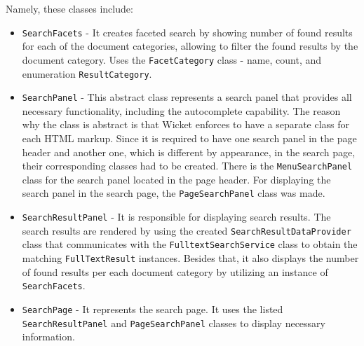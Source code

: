 Namely, these classes include:

\begin{itemize}
	
	\item \texttt{SearchFacets} - It creates faceted search by showing number of found results for each of the document categories, allowing to filter the found results by the document category. Uses the \texttt{FacetCategory} class - name, count, and enumeration \texttt{ResultCategory}. %
	
	\item \texttt{SearchPanel} - This abstract class represents a search panel that provides all necessary functionality, including the autocomplete capability. 
The reason why the class is abstract is that Wicket enforces to have a separate class for each HTML markup. 
Since it is required to have one search panel in the page header and another one, which is different by appearance, in the search page, their corresponding classes had to be created.
There is the \texttt{MenuSearchPanel} class for the search panel located in the page header. For displaying the search panel in the search page, the \texttt{PageSearchPanel} class was made.
	
	\item \texttt{SearchResultPanel} - It is responsible for displaying search results. %
	The search results are rendered by using the created \texttt{Search\-Result\-Data\-Provider} class that communicates with the \texttt{Fulltext\-Search\-Ser\-vice} class to obtain the matching \texttt{FullTextResult} instances. Besides that, it also displays the number of found results per each document category by utilizing an instance of \texttt{SearchFacets}.
	
	\item \texttt{SearchPage} - It represents the search page. It uses the listed \texttt{Search\-Re\-sult\-Pa\-nel} and \texttt{Page\-Search\-Panel} classes to display necessary information. 
	
\end{itemize}



